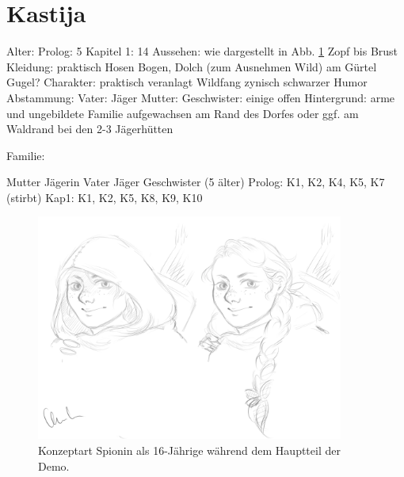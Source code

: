 \section{Kastija} \label{sec:mc-spionin}
\begin{outline}
	\1 Alter:
		\2 Prolog: 5
		\2 Kapitel 1: 14
	\1 Aussehen:
		\2 wie dargestellt in Abb. \ref{fig:mc-spionin}
		\2 Zopf bis Brust
	\1 Kleidung:
		\2 praktisch
		\2 Hosen 
		\2 Bogen, Dolch (zum Ausnehmen Wild) am Gürtel
		\2 Gugel?
	\1 Charakter:
		\2 praktisch veranlagt
		\2 Wildfang 
		\2 zynisch 
		\2 schwarzer Humor
	\1 Abstammung:
		\2 Vater: Jäger
		\2 Mutter: 
		\2 Geschwister: einige offen
	\1 Hintergrund:
		\2 arme und ungebildete Familie
		\2 aufgewachsen am Rand des Dorfes oder ggf. am Waldrand bei den 2-3 Jägerhütten
\end{outline}

Familie:
\begin{outline}
	\1 Mutter Jägerin
	\1 Vater Jäger
		 Geschwister (5 älter)
		\2 Prolog: K1, K2, K4, K5, K7 (stirbt)
		\2 Kap1: K1, K2, K5, K8, K9, K10
\end{outline}

\begin{figure}[tbh]
	\centering
	\includegraphics[width=0.9\textwidth]{Abbildungen/Abenteuer/Hauptcharaktere/spionin}
	\caption[Konzeptart Spionin]{Konzeptart Spionin als 16-Jährige während dem Hauptteil der Demo.}
	\label{fig:mc-spionin}
\end{figure}
